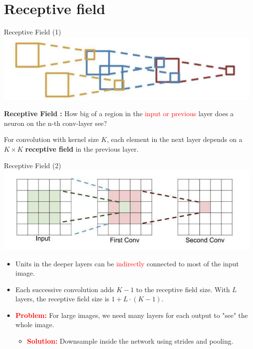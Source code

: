 \documentclass[serif, aspectratio=169]{beamer}
\begin{document}
	\section{Receptive field}
	\begin{frame}{Receptive Field (1)}
		\centering
		\includegraphics[keepaspectratio, scale=0.6]{pic/receptive1.png}
		\smallskip
		\begin{itemizer}
			\item \textbf{Receptive Field :} How big of a region in the \textcolor{red}{input or previous} layer does a neuron on the n-th conv-layer see?
			\item For convolution with kernel size $K$, each element in the next layer depends on a $K \times K$ \textbf{receptive field} in the previous layer.
		\end{itemizer}
	\end{frame}	
	\begin{frame}{Receptive Field (2)}
		\centering
		\includegraphics[keepaspectratio, scale=0.6]{pic/receptive.png}
		\smallskip
		\begin{itemize}
			\item Units in the deeper layers can be \textcolor{red}{indirectly} connected to most of the input image.
			\item Each successive convolution adds $K - 1$ to the receptive field size. With $L$ layers, the receptive field size is $1 + L \cdot (K - 1)$.
			\item \textcolor{red}{\textbf{Problem:}} For large images, we need many layers for each output to "see" the whole image.
			\begin{itemize}
				\item \textcolor{red}{\textbf{Solution:}} Downsample inside the network using strides and pooling.
			\end{itemize}
		\end{itemize}
	\end{frame}
\end{document}
